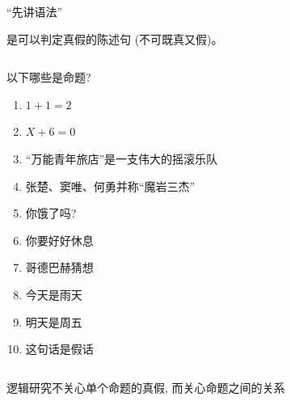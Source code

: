 
\begin{frame}{}
  \begin{center}
    {\Large ``先讲语法''}

    \vspace{0.30cm}
  \end{center}
\end{frame}

\begin{frame}{}
  \begin{definition}[命题 (Proposition)]
    是可以判定真假的陈述句 (不可既真又假)。
  \end{definition}

  \pause
  \begin{columns}
      \begin{exampleblock}{以下哪些是命题?}
        \begin{enumerate}
          \item $1 + 1 = 2$
          \item $X + 6 = 0$
          \pause
          \item ``万能青年旅店''是一支伟大的摇滚乐队
          \item 张楚、窦唯、何勇并称``魔岩三杰''
          \pause
          \item 你饿了吗?
          \item 你要好好休息
          \pause
          \item 哥德巴赫猜想
          \pause
          \item 今天是雨天
          \item 明天是周五
          \pause
          \item 这句话是假话
        \end{enumerate}
      \end{exampleblock}
      \pause
  \end{columns}
\end{frame}

\begin{frame}{}
  \begin{center}

    \vspace{1.00cm}
    逻辑研究不关心单个命题的真假, 而关心命题之间的关系
  \end{center}
\end{frame}

